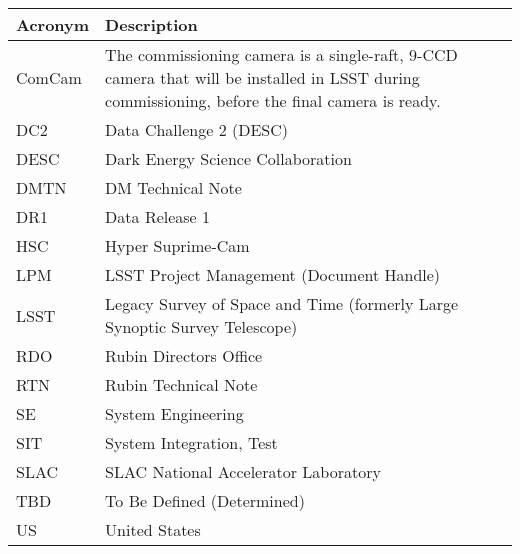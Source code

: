 \addtocounter{table}{-1}
\begin{longtable}{p{}p{}}\hline
\textbf{Acronym} & \textbf{Description}  \\\hline

ComCam & The commissioning camera is a single-raft, 9-CCD camera that will be installed in LSST during commissioning, before the final camera is ready. \\\hline
DC2 & Data Challenge 2 (DESC) \\\hline
DESC & Dark Energy Science Collaboration \\\hline
DMTN & DM Technical Note \\\hline
DR1 & Data Release 1 \\\hline
HSC & Hyper Suprime-Cam \\\hline
LPM & LSST Project Management (Document Handle) \\\hline
LSST & Legacy Survey of Space and Time (formerly Large Synoptic Survey Telescope) \\\hline
RDO & Rubin Directors Office \\\hline
RTN & Rubin Technical Note \\\hline
SE & System Engineering \\\hline
SIT & System Integration, Test \\\hline
SLAC & SLAC National Accelerator Laboratory \\\hline
TBD & To Be Defined (Determined) \\\hline
US & United States \\\hline
\end{longtable}
